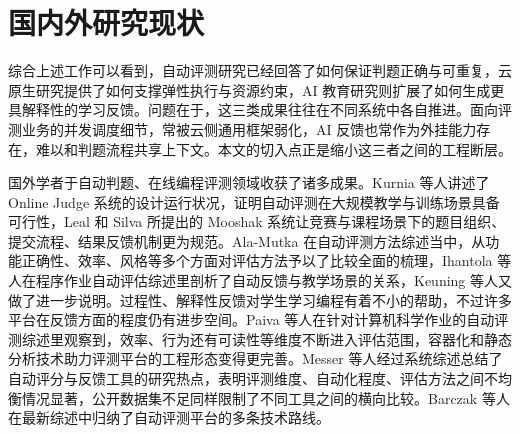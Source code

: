 \section{国内外研究现状}

综合上述工作可以看到，自动评测研究已经回答了如何保证判题正确与可重复，云原生研究提供了如何支撑弹性执行与资源约束，AI 教育研究则扩展了如何生成更具解释性的学习反馈。问题在于，这三类成果往往在不同系统中各自推进。面向评测业务的并发调度细节，常被云侧通用框架弱化，AI 反馈也常作为外挂能力存在，难以和判题流程共享上下文。本文的切入点正是缩小这三者之间的工程断层。

国外学者于自动判题、在线编程评测领域收获了诸多成果。Kurnia 等人讲述了 Online Judge 系统的设计运行状况，证明自动评测在大规模教学与训练场景具备可行性\cite{kurnia2001online}，Leal 和 Silva 所提出的 Mooshak 系统让竞赛与课程场景下的题目组织、提交流程、结果反馈机制更为规范\cite{leal2003mooshak}。Ala-Mutka 在自动评测方法综述当中，从功能正确性、效率、风格等多个方面对评估方法予以了比较全面的梳理\cite{ala2005survey}，Ihantola 等人在程序作业自动评估综述里剖析了自动反馈与教学场景的关系\cite{ihantola2011automated}，Keuning 等人又做了进一步说明。过程性、解释性反馈对学生学习编程有着不小的帮助，不过许多平台在反馈方面的程度仍有进步空间\cite{keuning2018feedback}。Paiva 等人在针对计算机科学作业的自动评测综述里观察到，效率、行为还有可读性等维度不断进入评估范围，容器化和静态分析技术助力评测平台的工程形态变得更完善\cite{paiva2022automated}。Messer 等人经过系统综述总结了自动评分与反馈工具的研究热点，表明评测维度、自动化程度、评估方法之间不均衡情况显著，公开数据集不足同样限制了不同工具之间的横向比较\cite{messer2024automated}。Barczak 等人在最新综述中归纳了自动评测平台的多条技术路线\cite{barczak2023automated}。

